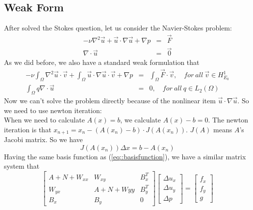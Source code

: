 \documentclass[a4paper]{article}
\begin{document}
\subsection{Weak Form}
After solved the Stokes question, let us consider the Navier-Stokes problem:
\begin{equation}
\begin{array}{rcl}
-\nu \nabla^2 \vec{u} + \vec{u}\cdot \nabla \vec{u} + \nabla p &=& \vec{F} \\
\nabla \cdot \vec{u} &=& \vec{0}
\label{eq::Navier-Stokes-problem}
\end{array}
\end{equation}
As we did before, we also have a standard weak formulation that
\begin{equation}
\begin{array}{rcl}
-\nu\int_\Omega \nabla^2 \vec{u} \cdot \vec{v}+\int_{\Omega}\vec{u}\cdot\nabla\vec{u}\cdot\vec{v} + \nabla p &=& \int_{\Omega}\vec{F}\cdot \vec{v},\quad for \ all \ \vec{v} \in H^1_{E_0} \\
\int_\Omega q\nabla \cdot \vec{u} &=&0,\quad for \ all \ q \in L_2(\Omega)
\label{eq::Navier-Stokes-weakform}
\end{array}
\end{equation}
Now we can't solve the problem directly because of the nonlinear item $\vec{u}\cdot \nabla \vec{u}$. So we need to use newton iteration:\\
\indent When we need to calculate $A(x)=b$, we calculate $A(x)-b=0$. The newton iteration is that $x_{n+1}=x_{n} - (A(x_n)-b)\cdot J(A(x_{n}))$. $J(A)$ means $A$'s Jacobi matrix. So we have
$$ J(A(x_n))\Delta x = b - A(x_n)$$
\indent Having the same basis function as (\ref{eq::basisfunction}), we have a similar matrix system that
\begin{equation}
\left[ \begin{array}{ccc}
A + N +W_{xx} & W_{xy} & B_x^T \\
W_{yx} & A +N +W{yy}& B_y^T \\
B_x & B_y & 0
\end{array}
\right]
\left[\begin{array}{ccc}
\Delta u_x\\
\Delta u_y\\
\Delta p
\end{array}
\right]=
\left[\begin{array}{ccc}
f_x\\
f_y\\
g
\end{array}
\right]
\label{Navier-Stokes}
\end{equation}
\end{document}
